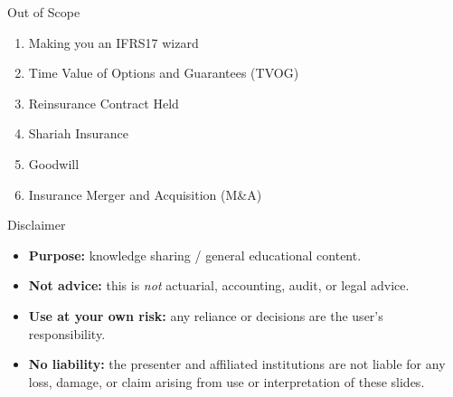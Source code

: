 \documentclass[aspectratio=169]{beamer}
\begin{document}
\begin{frame}{Out of Scope}
\begin{enumerate}
\item Making you an IFRS17 wizard
\item Time Value of Options and Guarantees (TVOG)
\item Reinsurance Contract Held
\item Shariah Insurance
\item Goodwill 
\item Insurance Merger and Acquisition (M\&A)
\end{enumerate}
\end{frame}
\begin{frame}{Disclaimer}
  \vspace{0.3em}
  \begin{tcolorbox}[
    title=\textbf{Please read},
    colback=blue!5,
    colframe=blue!70!black,
    coltitle=white,
    colbacktitle=blue!70!black,
    fonttitle=\bfseries,
    boxrule=0.9pt,
    arc=3pt,
    left=8pt,right=8pt,top=6pt,bottom=6pt
  ]
  \small
  \begin{itemize}
    \item \textbf{Purpose:} knowledge sharing / general educational content.
    \item \textbf{Not advice:} this is \emph{not} actuarial, accounting, audit, or legal advice.
    \item \textbf{Use at your own risk:} any reliance or decisions are the user’s responsibility.
    \item \textbf{No liability:} the presenter and affiliated institutions are not liable for any loss, damage, or claim arising from use or interpretation of these slides.
  \end{itemize}
  \end{tcolorbox}
\end{frame}
\end{document}
